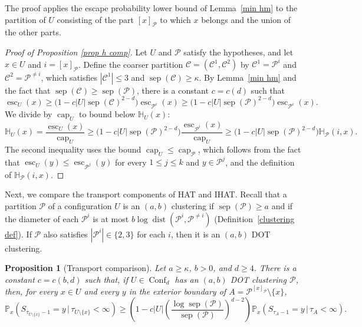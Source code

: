 \documentclass[11pt,reqno]{amsart}
\newtheorem{proposition}[lemma]{Proposition}
\theoremstyle{definition}
\numberwithin{equation}{section}
\renewcommand{\P}{\mathbb{P}}
\newcommand{\1}{\mathbf{1}}
\renewcommand{\H}{\mathbb{H}}
\DeclareMathOperator{\dist}{dist}
\DeclareMathOperator{\sep}{sep}
\DeclareMathOperator{\capac}{cap}
\DeclareMathOperator{\Es}{esc}
\newcommand{\CC}{\mathcal{C}}
\DeclareMathOperator{\Conf}{\mathrm{Conf}}
\begin{document}
The proof applies the escape probability lower bound of Lemma~\ref{min hm} to the partition of $U$ consisting of the part $[x]_{\mathcal{P}}$ to which $x$ belongs and the union of the other parts.

\begin{proof}[Proof of Proposition \ref{prop h comp}]
Let $U$ and $\mathcal{P}$ satisfy the hypotheses, and let $x \in U$ and $i = [x]_\mathcal{P}$. Define the coarser partition $\CC = (\CC^1, \CC^2)$ by $\CC^1 = \mathcal{P}^i$ and $\CC^2 = \mathcal{P}^{\neq i}$, which satisfies $|\CC^1| \leq 3$ and $\sep (\CC) \geq \kappa$. By Lemma~\ref{min hm} and the fact that $\sep (\CC) \geq \sep (\mathcal{P})$, there is a constant $c = c(d)$ such that
\[
\Es_U (x) \geq \big(1 - c |U| \sep (\CC)^{2-d} \big) \Es_{\mathcal{P}^i} (x) \geq \big(1 - c |U| \sep (\mathcal{P})^{2-d} \big) \Es_{\mathcal{P}^i} (x).
\]
We divide by $\capac_U$ to bound below $\H_U (x)$:
\[
\H_U (x) = \frac{\Es_U (x)}{\capac_U} \geq \big(1 - c |U| \sep (\mathcal{P})^{2-d} \big) \frac{\Es_{\mathcal{P}^i} (x)}{\capac_U} \geq \big(1 - c |U| \sep (\mathcal{P})^{2-d} \big) \H_{\mathcal{P}} (i,x).
\]
The second inequality uses the bound $\capac_U \leq \capac_\mathcal{P}$, which follows from the fact that $\Es_U (y) \leq \Es_{\mathcal{P}^j} (y)$ for every $1 \leq j \leq k$ and $y \in \mathcal{P}^j$, and the definition of $\H_{\mathcal{P}} (i,x)$.
\end{proof}

Next, we compare the transport components of HAT and IHAT. Recall that a partition $\mathcal{P}$ of a configuration $U$ is an $(a,b)$ clustering if $\sep (\mathcal{P}) \geq a$ and if the diameter of each $\mathcal{P}^i$ is at most $b \log \dist (\mathcal{P}^i, \mathcal{P}^{\neq i})$ (Definition~\ref{clustering def}). If $\mathcal{P}$ also satisfies $|\mathcal{P}^i| \in \{2,3\}$ for each $i$, then it is an $(a,b)$ DOT clustering.

\begin{proposition}[Transport comparison]\label{prop t comp}
Let $a \geq \kappa$, $b > 0$, and $d \geq 4$. There is a constant $c = c(b,d)$ such that, if $U \in \Conf_d$ has an $(a,b)$ DOT clustering $\mathcal{P}$, 
then, for every $x \in U$ and every $y$ in the exterior boundary of $A = \mathcal{P}^{[x]_{\mathcal{P}}} {\setminus} \{x\}$, 
\begin{equation*}
\P_x (S_{\tau_{U {\setminus} \{x\}}-1} = y \,\vert\, \tau_{U {\setminus} \{x\}} < \infty) \geq \left(1 - c |U| \left( \frac{\log \sep (\mathcal{P})}{\sep (\mathcal{P})} \right)^{d-2} \right) \P_x (S_{\tau_A-1} = y \,\vert\, \tau_A < \infty).
\end{equation*}
\end{proposition}
\end{document}
